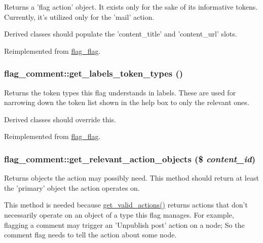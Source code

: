 Returns a 'flag action' object. It exists only for the sake of its informative tokens. Currently, it's utilized only for the 'mail' action.

Derived classes should populate the 'content\_\-title' and 'content\_\-url' slots. 

Reimplemented from \hyperlink{classflag__flag_532e58b6e71a0ef8f6bcb55607cbca8e}{flag\_\-flag}.\hypertarget{classflag__comment_9f6744e13e425967435db592d30cba69}{
\subsubsection[{get\_\-labels\_\-token\_\-types}]{\setlength{\rightskip}{0pt plus 5cm}flag\_\-comment::get\_\-labels\_\-token\_\-types ()}}
\label{classflag__comment_9f6744e13e425967435db592d30cba69}


Returns the token types this flag understands in labels. These are used for narrowing down the token list shown in the help box to only the relevant ones.

Derived classes should override this. 

Reimplemented from \hyperlink{classflag__flag_bc21f4a879072d1a9d36b352e9ac6be0}{flag\_\-flag}.\hypertarget{classflag__comment_9092237266a5e5fce69be0a4cdfd602e}{
\subsubsection[{get\_\-relevant\_\-action\_\-objects}]{\setlength{\rightskip}{0pt plus 5cm}flag\_\-comment::get\_\-relevant\_\-action\_\-objects (\$ {\em content\_\-id})}}
\label{classflag__comment_9092237266a5e5fce69be0a4cdfd602e}


Returns objects the action may possibly need. This method should return at least the 'primary' object the action operates on.

This method is needed because \hyperlink{group__actions_gbe1aa2bfc551fab8660cc3bacfc9d509}{get\_\-valid\_\-actions()} returns actions that don't necessarily operate on an object of a type this flag manages. For example, flagging a comment may trigger an 'Unpublish post' action on a node; So the comment flag needs to tell the action about some node.

